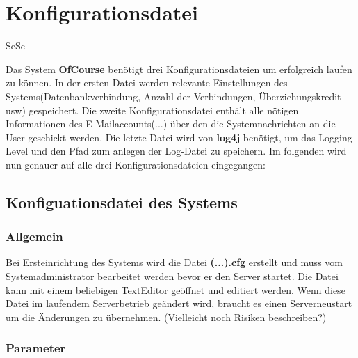 \chapter{Konfigurationsdatei}
\begin{tiny}
	SeSc
\end{tiny}

Das System \textbf{OfCourse} benötigt drei Konfigurationsdateien um erfolgreich laufen zu können. In der ersten Datei werden relevante Einstellungen des Systems(Datenbankverbindung, Anzahl der Verbindungen, Überziehungskredit usw) gespeichert. Die zweite Konfigurationsdatei enthält alle nötigen Informationen des E-Mailaccounts(...) über den die Systemnachrichten an die User geschickt werden. Die letzte Datei wird von \textbf{log4j} benötigt, um das Logging Level und den Pfad zum anlegen der Log-Datei zu speichern. Im folgenden wird nun genauer auf alle drei Konfigurationsdateien eingegangen:

\section{Konfiguationsdatei des Systems}
\subsection{Allgemein}

Bei Ersteinrichtung des Systems wird die Datei \textbf{(...).cfg} erstellt und muss vom Systemadministrator bearbeitet werden bevor er den Server startet. Die Datei kann mit einem beliebigen TextEditor geöffnet und editiert werden. Wenn diese Datei im laufendem Serverbetrieb geändert wird, braucht es einen Serverneustart um die Änderungen zu übernehmen.
(Vielleicht noch Risiken beschreiben?)

\subsection{Parameter}

